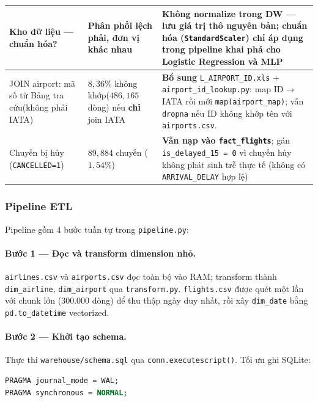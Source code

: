 \begin{table}[H]
\begin{tabular}{|p{3.8cm}|p{3.2cm}|p{7.2cm}|}
Kho dữ liệu --- chuẩn hóa?
  & Phân phối lệch phải, đơn vị khác nhau
  & \textbf{Không normalize} trong DW --- lưu giá trị thô nguyên bản;
    chuẩn hóa (\texttt{StandardScaler}) chỉ áp dụng trong pipeline khai phá
    cho Logistic Regression và MLP \\ \hline

JOIN airport: mã số từ Bảng tra cứu\newline (không phải IATA)
  & $8{,}36\%$ không khớp\newline ($486{,}165$ dòng) nếu \textbf{chỉ} join IATA
  & \textbf{Bổ sung} \texttt{L\_AIRPORT\_ID.xls} + \texttt{airport\_id\_lookup.py}:
    map ID$\rightarrow$IATA rồi mới \texttt{map(airport\_map)}; vẫn \texttt{dropna}
    nếu ID không khớp tên với \texttt{airports.csv}. \\ \hline

Chuyến bị hủy (\texttt{CANCELLED=1})
  & $89{,}884$ chuyến ($1{,}54\%$)
  & \textbf{Vẫn nạp vào \texttt{fact\_flights}}; gán
    \texttt{is\_delayed\_15 = 0} vì chuyến hủy không phát sinh trễ thực tế
    (không có \texttt{ARRIVAL\_DELAY} hợp lệ) \\ \hline

\end{tabular}
\label{tab:eda_etl_decisions}
\end{table}

\subsubsection{Pipeline ETL}

Pipeline gồm 4 bước tuần tự trong \texttt{pipeline.py}:

\paragraph{Bước 1 --- Đọc và transform dimension nhỏ.}
\texttt{airlines.csv} và \texttt{airports.csv} đọc toàn bộ vào RAM; transform thành \texttt{dim\_airline}, \texttt{dim\_airport}
qua \texttt{transform.py}. \texttt{flights.csv} được quét một lần với chunk lớn (300.000 dòng) để thu thập ngày duy nhất,
rồi xây \texttt{dim\_date} bằng \texttt{pd.to\_datetime} vectorized.

\paragraph{Bước 2 --- Khởi tạo schema.}
Thực thi \texttt{warehouse/schema.sql} qua \texttt{conn.executescript()}. Tối ưu ghi SQLite:
\begin{lstlisting}[language=SQL, caption={SQLite PRAGMA tối ưu ghi}]
PRAGMA journal_mode = WAL;
PRAGMA synchronous = NORMAL;
\end{lstlisting}


